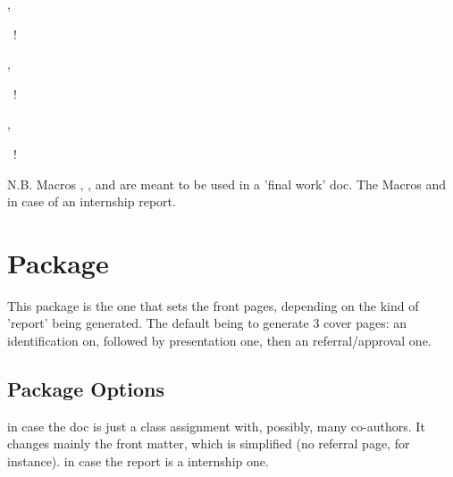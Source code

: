 \documentclass[dctools,english,tocdepth=3,secdepth=3]{ufrgscca} %
\begin{document}
\begin{Macros}{\altexaminer,\altexaminerinfo}%
	\begin{Syntax}%
		~\Macro!{\altexaminer}{}
	\end{Syntax}
\end{Macros}

\begin{Macros}{\tutor,\tutorinfo}%
\begin{Syntax}%
    ~\Macro!{\tutor}{}
\end{Syntax}
\end{Macros}

\begin{Macros}{\supervisor,\supervisorinfo}%
\begin{Syntax}%
    ~\Macro!{\supervisor}{}
\end{Syntax}
\end{Macros}

N.B. Macros \Macro{\advisor}{}, \Macro{\coadvisor}{}, \Macro{\examiner}{} and \Macro{\altexaminer}{} are meant to be used in a 'final work' doc. The Macros \Macro{\tutor}{} and \Macro{\supervisor}{} in case of an internship report.


\section{ Package}
This package is the one that sets the front pages, depending on the kind of 'report' being generated. The default being to generate 3 cover pages: an identification on, followed by presentation one, then an referral/approval one.

\subsection{Package Options}
\begin{Options}
	 in case the doc is just a class assignment with, possibly, many co-authors. It changes mainly the front matter, which is simplified (no referral page, for instance).
	 in case the report is a internship one.
\end{Options}
\end{document}
